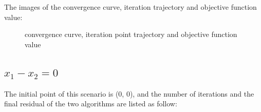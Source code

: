 \documentclass[12pt]{article}
\begin{document}
The images of the convergence curve, iteration trajectory and objective function value:\\
\begin{figure}[ht]
\centering
{}
\caption[]{convergence curve, iteration point trajectory and objective function value}
\label{fig:s1}
\end{figure}
\subsection{$x_1 - x_2 = 0 $}

The initial point of this scenario is (0, 0), and the number of iterations and the final residual of the two algorithms are listed as follow:\\
\begin{table}[h]
    \centering
    \caption{s2}
    \label{tab:s2}
\end{table}
\end{document}

